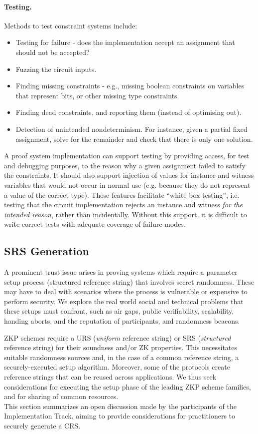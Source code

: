 \paragraph{Testing.}
Methods to test constraint systems include:
\begin{itemize}[label={- }]
    \item Testing for failure - does the implementation accept an assignment that should not be accepted?
    \item Fuzzing the circuit inputs.
    \item Finding missing constraints - e.g., missing boolean constraints on variables that represent bits, or other missing type constraints.
    \item Finding dead constraints, and reporting them (instead of optimising out).
    \item Detection of unintended nondeterminism. For instance, given a partial fixed assignment, solve for the remainder and check that there is only one solution.
\end{itemize}

A proof system implementation can support testing by providing access, for test and debugging purposes, to the reason why a given assignment failed to satisfy the constraints. It should also support injection of values for instance and witness variables that would not occur in normal use (e.g. because they do not represent a value of the correct type). These features facilitate “white box testing”, i.e. testing that the circuit implementation rejects an instance and witness \emph{for the intended reason}, rather than incidentally. Without this support, it is difficult to write correct tests with adequate coverage of failure modes.


\subsection{SRS Generation}

A prominent trust issue arises in proving systems which require a parameter setup process (structured reference string) that involves secret randomness. 
These may have to deal with scenarios where the process is vulnerable or expensive to perform security. 
We explore the real world social and technical problems that these setups must confront, such as air gaps, public verifiability, scalability, handing aborts, and the reputation of participants, and randomness beacons.

ZKP schemes require a URS (\emph{uniform} reference string) or SRS (\emph{structured} reference string) for their soundness and/or ZK properties. 
This necessitates suitable randomness sources and, in the case of a common reference string, a securely-executed setup algorithm. 
Moreover, some of the protocols create reference strings that can be reused across applications. 
We thus seek considerations for executing the setup phase of the leading ZKP scheme families, and for sharing of common resources.\\
This section summarizes an open discussion made by the participants of the Implementation Track, aiming to provide considerations for practitioners to securely generate a CRS.


